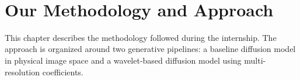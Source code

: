 
﻿\chapter{Our Methodology and Approach}
\label{chap:methodology}

This chapter describes the methodology followed during the internship. The approach is organized around two generative pipelines: a baseline diffusion model in physical image space and a wavelet-based diffusion model using multi-resolution coefficients.




%  





